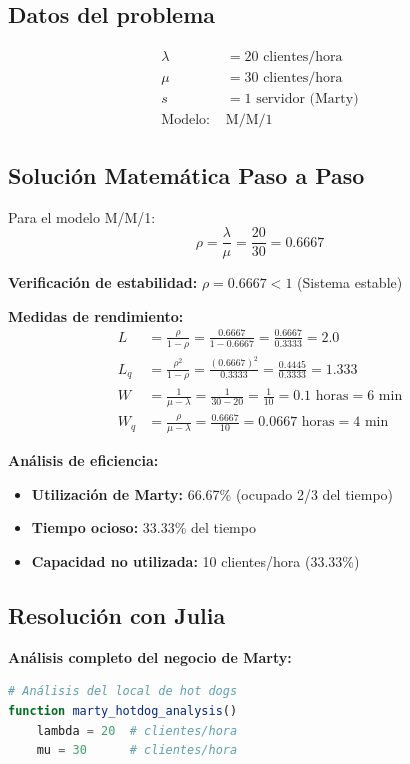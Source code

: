 \documentclass[12pt, a4paper, oneside]{book}
\theoremstyle{definition}
\begin{document}
\begin{center}
\begin{center}
\subsection{Datos del problema}
\begin{align*}
\lambda &= 20 \text{ clientes/hora} \\
\mu &= 30 \text{ clientes/hora} \\
s &= 1 \text{ servidor (Marty)} \\
\text{Modelo: } &\text{M/M/1}
\end{align*}

\subsection{Solución Matemática Paso a Paso}

Para el modelo M/M/1:
$$\rho = \frac{\lambda}{\mu} = \frac{20}{30} = 0.6667$$

\textbf{Verificación de estabilidad:} $\rho = 0.6667 < 1$ \checkmark (Sistema estable)

\textbf{Medidas de rendimiento:}
\begin{align*}
L &= \frac{\rho}{1-\rho} = \frac{0.6667}{1-0.6667} = \frac{0.6667}{0.3333} = 2.0 \\
L_q &= \frac{\rho^2}{1-\rho} = \frac{(0.6667)^2}{0.3333} = \frac{0.4445}{0.3333} = 1.333 \\
W &= \frac{1}{\mu - \lambda} = \frac{1}{30 - 20} = \frac{1}{10} = 0.1 \text{ horas} = 6 \text{ min} \\
W_q &= \frac{\rho}{\mu - \lambda} = \frac{0.6667}{10} = 0.0667 \text{ horas} = 4 \text{ min}
\end{align*}

\textbf{Análisis de eficiencia:}
\begin{itemize}
\item \textbf{Utilización de Marty:} 66.67\% (ocupado 2/3 del tiempo)
\item \textbf{Tiempo ocioso:} 33.33\% del tiempo
\item \textbf{Capacidad no utilizada:} 10 clientes/hora (33.33\%)
\end{itemize}

\subsection{Resolución con Julia}

\textbf{Análisis completo del negocio de Marty:}

\begin{lstlisting}[language=Julia]
# Análisis del local de hot dogs
function marty_hotdog_analysis()
    lambda = 20  # clientes/hora
    mu = 30      # clientes/hora
    

\end{lstlisting}
\end{center}
\end{center}
\end{document}

